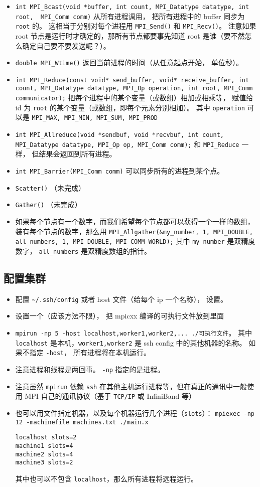 \begin{itemize}
\item \verb|int MPI_Bcast(void *buffer, int count, MPI_Datatype datatype, int root,  MPI_Comm comm)| 从所有进程调用， 把所有进程中的 buffer 同步为 \verb`root` 的。 这相当于分别对每个进程用 \verb|MPI_Send()| 和 \verb|MPI_Recv()|。 注意如果 root 节点是运行时才确定的，那所有节点都要事先知道 root 是谁（要不然怎么确定自己要不要发送呢？）。
\item \verb|double MPI_Wtime()| 返回当前进程的时间（从任意起点开始， 单位秒）。
\item \verb|int MPI_Reduce(const void* send_buffer, void* receive_buffer, int count, MPI_Datatype datatype, MPI_Op operation, int root, MPI_Comm communicator);| 把每个进程中的某个变量（或数组）相加或相乘等， 赋值给 id 为 \verb|root| 的某个变量（或数组，即每个元素分别相加）。 其中 \verb|operation| 可以是 \verb|MPI_MAX, MPI_MIN, MPI_SUM, MPI_PROD|
\item \verb|int MPI_Allreduce(void *sendbuf, void *recvbuf, int count, MPI_Datatype datatype, MPI_Op op, MPI_Comm comm);| 和 \verb|MPI_Reduce| 一样， 但结果会返回到所有进程。
\item \verb|int MPI_Barrier(MPI_Comm comm)| 可以同步所有的进程到某个点。
\item \verb|Scatter()| （未完成）
\item \verb|Gather()| （未完成）
\item 如果每个节点有一个数字，而我们希望每个节点都可以获得一个一样的数组，装有每个节点的数字，那么用 \verb`MPI_Allgather(&my_number, 1, MPI_DOUBLE, all_numbers, 1, MPI_DOUBLE, MPI_COMM_WORLD);` 其中 \verb`my_number` 是双精度数字， \verb`all_numbers` 是双精度数组的指针。
\end{itemize}

\subsection{配置集群}
\begin{itemize}
\item 配置 \verb`~/.ssh/config` 或者 host 文件（给每个 ip 一个名称）， 设置。
\item 设置一个（应该方法不限）， 把 mpicxx 编译的可执行文件放到里面
\item \verb|mpirun -np 5 -host localhost,worker1,worker2,... ./可执行文件|。 其中 \verb`localhost` 是本机，\verb`worker1,worker2` 是 ssh config 中的其他机器的名称。 如果不指定 \verb`-host`， 所有进程将在本机运行。
\item 注意进程和线程是两回事。 \verb`-np` 指定的是进程。
\item 注意虽然 \verb`mpirun` 依赖 \verb`ssh` 在其他主机运行进程等，但在真正的通讯中一般使用 MPI 自己的通讯协议（基于 \verb`TCP/IP` 或 InfiniBand 等）
\item 也可以用文件指定机器，以及每个机器运行几个进程（\verb`slots`）： \verb`mpiexec -np 12 -machinefile machines.txt ./main.x`
\begin{lstlisting}[language=none,caption=machines.txt]
localhost slots=2
machine1 slots=4
machine2 slots=4
machine3 slots=2
\end{lstlisting}
其中也可以不包含 \verb`localhost`，那么所有进程将远程运行。
\end{itemize}
